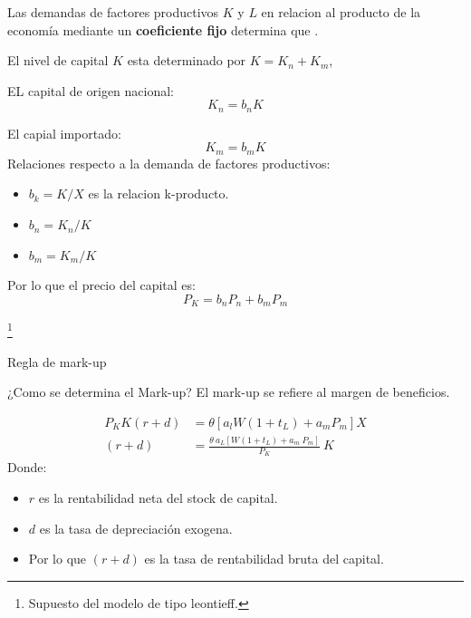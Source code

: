 \documentclass[
  ignorenonframetext,
]{beamer}
\providecommand{\tightlist}{%
  \setlength{\itemsep}{0pt}\setlength{\parskip}{0pt}}\usepackage{longtable,booktabs,array}
\begin{document}
\begin{frame}{}
\label{section-1}
Las demandas de factores productivos \(K\) y \(L\) en relacion al
producto de la economía mediante un \textbf{coeficiente fijo} determina
que .

El nivel de capital \(K\) esta determinado por \(K=K_n+K_m\),

EL capital de origen nacional: \[K_n=b_n K \tag{5} \]

El capial importado: \[
K_m=b_m K
\tag{6}
\] Relaciones respecto a la demanda de factores productivos:

\begin{itemize}
\tightlist
\item
  \(b_k= K/X\) es la relacion k-producto.
\item
  \(b_n=K_n/K\)
\item
  \(b_m=K_m/K\)
\end{itemize}

Por lo que el precio del capital es: \[
P_K=b_nP_n+b_mP_m 
\tag{7}
\]

\footnote{Supuesto del modelo de tipo leontieff.}
\end{frame}

\begin{frame}{Regla de mark-up}
\label{regla-de-mark-up}
\begin{block}{¿Como se determina el Mark-up?}
\label{como-se-determina-el-mark-up}
El mark-up se refiere al margen de beneficios.

\[
\begin{aligned}
P_KK(r+d)&=\theta[a_lW(1+t_L)+a_mP_m]X\\
(r+d)&= \frac{\theta\ a_L[W(1+t_L)+a_m\ P_m]}{P_K}\ K
\end{aligned}\tag{8}
\] Donde:

\begin{itemize}
  \item[\textbullet] $r$ es la rentabilidad neta del stock de capital.
  \item[\textbullet] $d$ es la tasa de depreciación exogena.
  \item[\textbullet] Por lo que $(r+d)$ es la tasa de rentabilidad bruta del capital.
\end{itemize}
\end{block}
\end{frame}
\end{document}
